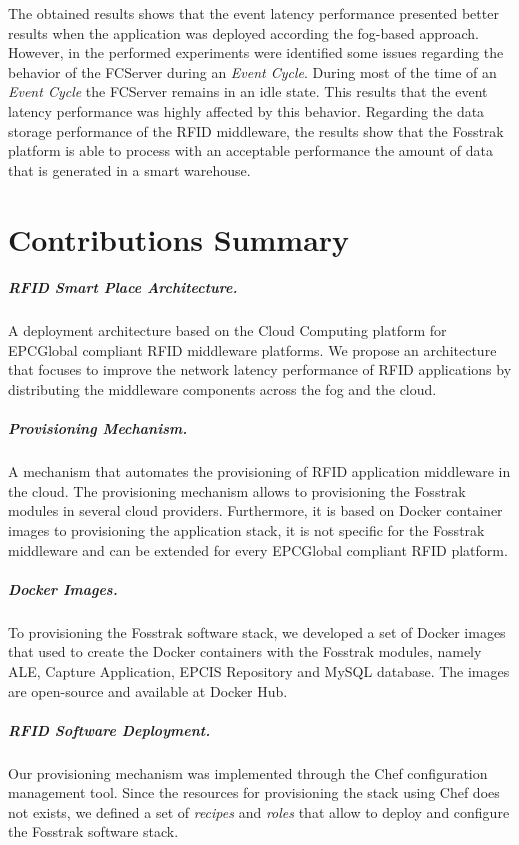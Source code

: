 The obtained results shows that the event latency performance presented better results when the
application was deployed according the fog-based approach. However, in the performed experiments
were identified some issues regarding the behavior of the FCServer during an \textit{Event Cycle}.
During most of the time of an \textit{Event Cycle} the FCServer remains in an idle state. This
results that the event latency performance was highly affected by this behavior. Regarding the data
storage performance of the \gls{RFID} middleware, the results show that the Fosstrak platform is
able to process with an acceptable performance the amount of data that is generated in a smart
warehouse.

\section{Contributions Summary}
\label{sec:contributions}

\subparagraph{RFID Smart Place Architecture.}
\label{subp:rfid_smart_place_architecture}
A deployment architecture based on the Cloud Computing platform for EPCGlobal compliant \gls{RFID}
middleware platforms. We propose an architecture that focuses to improve the network latency
performance of \gls{RFID} applications by distributing the middleware components across the fog and
the cloud.

\subparagraph{Provisioning Mechanism.}
\label{subp:provisioning_mechanism}
A mechanism that automates the provisioning of \gls{RFID} application middleware in the cloud.
The provisioning mechanism allows to provisioning the Fosstrak modules in several cloud
providers. Furthermore, it is based on Docker container images to provisioning the application
stack, it is not specific for the Fosstrak middleware and can be extended for every EPCGlobal
compliant \gls{RFID} platform.

\subparagraph{Docker Images.}
\label{subp:docker_images}
To provisioning the Fosstrak software stack, we developed a set of Docker images that used to
create the Docker containers with the Fosstrak modules, namely \gls{ALE}, Capture Application,
\gls{EPCIS} Repository and MySQL database. The images are open-source and available at
Docker Hub.

\subparagraph{RFID Software Deployment.}
\label{subp:RFID Software Deployment}
Our provisioning mechanism was implemented through the Chef configuration management tool. Since the
resources for provisioning the stack using Chef does not exists, we defined a set of \textit{recipes}
and \textit{roles} that allow to deploy and configure the Fosstrak software stack.

